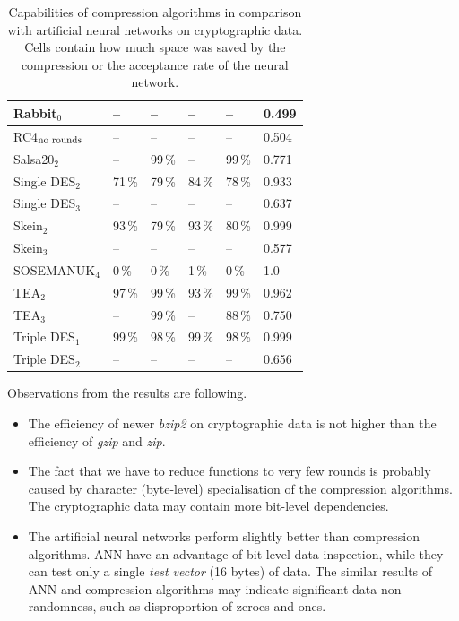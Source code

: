\documentclass[
    digital,    %
    oneside,    %
    color,
    11pt,
    nocover,
    notable,
    nolof,
    nolot,
]{fithesis3}
\newcommand{\fd}{\cellcolor{red!25}}
\newcommand{\fn}{}
\begin{document}
\begin{table}[t]
\begin{tabular}{@{}l|lllll}
Rabbit$_{0}$                     & --     \fn & --     \fn & --     \fn & --     \fn & 0.499 \fn \\ \hline
RC4$_{\textnormal{no rounds}}$   & --     \fn & --     \fn & --     \fn & --     \fn & 0.504 \fn \\ \hline
Salsa20$_{2}$                    & --     \fn & 99\,\% \fd & --     \fn & 99\,\% \fd & 0.771 \fd \\ \hline
Single DES$_{2}$                 & 71\,\% \fd & 79\,\% \fd & 84\,\% \fd & 78\,\% \fd & 0.933 \fd \\
Single DES$_{3}$                 & --     \fn & --     \fn & --     \fn & --     \fn & 0.637 \fd \\ \hline
Skein$_{2}$                      & 93\,\% \fd & 79\,\% \fd & 93\,\% \fd & 80\,\% \fd & 0.999 \fd \\ \hline
Skein$_{3}$                      & --     \fn & --     \fn & --     \fn & --     \fn & 0.577 \fd \\ \hline
SOSEMANUK$_{4}$                  & 0\,\%  \fd & 0\,\%  \fd & 1\,\%  \fd & 0\,\%  \fd & 1.0   \fd \\ \hline
TEA$_{2}$                        & 97\,\% \fd & 99\,\% \fd & 93\,\% \fd & 99\,\% \fd & 0.962 \fd \\
TEA$_{3}$                        & --     \fn & 99\,\% \fd & --     \fn & 88\,\% \fd & 0.750 \fd \\ \hline
Triple DES$_{1}$                 & 99\,\% \fd & 98\,\% \fd & 99\,\% \fd & 98\,\% \fd & 0.999 \fd \\
Triple DES$_{2}$                 & --     \fn & --     \fn & --     \fn & --     \fn & 0.656 \fd

\end{tabular}

\caption{Capabilities of compression algorithms in comparison with artificial neural networks on cryptographic data. Cells contain how much space was saved by the compression or the acceptance rate of the neural network.}
\label{table:res-compression}
\end{table}

Observations from the results are following.

\begin{itemize}
    \item The efficiency of newer \textit{bzip2} on cryptographic data is not higher than the efficiency of \textit{gzip} and \textit{zip}.
    \item The fact that we have to reduce functions to very few rounds is probably caused by character (byte-level) specialisation of the compression algorithms. The cryptographic data may contain more bit-level dependencies.
    \item The artificial neural networks perform slightly better than compression algorithms. ANN have an advantage of bit-level data inspection, while they can test only a single \textit{test vector} (16 bytes) of data. The similar results of ANN and compression algorithms may indicate significant data non-randomness, such as disproportion of zeroes and ones.
\end{itemize}
\end{document}
